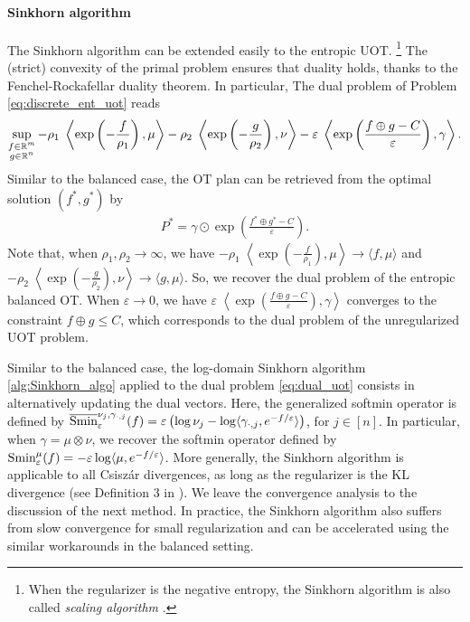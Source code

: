 \paragraph{Sinkhorn algorithm} The Sinkhorn algorithm can be extended easily to the entropic UOT.
\footnote{When the regularizer is the negative entropy, the Sinkhorn algorithm is also called
\textit{scaling algorithm} \citep{Chizat18a}.} The (strict) convexity of the primal problem ensures
that duality holds, thanks to the Fenchel-Rockafellar duality theorem. In particular,
The dual problem of Problem \eqref{eq:discrete_ent_uot} reads
\begin{align}
  \label{eq:dual_uot}
  \sup_{\substack{f \in \mathbb R^m \\ g \in \mathbb R^n}}
  -\rho_1 \; \left\langle \exp \left( - \frac{f}{\rho_1}\right), \mu \right\rangle
  -\rho_2 \; \left\langle \exp \left( - \frac{g}{\rho_2} \right), \nu \right\rangle
  - \varepsilon \; \left\langle \exp
  \left( \frac{f \oplus g - C}{\varepsilon} \right), \gamma \right\rangle.
\end{align}
Similar to the balanced case, the OT plan can be retrieved from the optimal solution $(f^*, g^*)$ by
\begin{align}
  P^* = \gamma \odot \exp \left( \frac{f^* \oplus g^* - C}{\varepsilon} \right).
\end{align}
Note that, when $\rho_1, \rho_2 \to \infty$, we have
$-\rho_1 \; \left\langle \exp \left( - \frac{f}{\rho_1}\right), \mu \right\rangle \to
\langle f, \mu \rangle$ and
$-\rho_2 \; \left\langle \exp \left( - \frac{g}{\rho_2} \right), \nu \right\rangle \to \langle g, \mu \rangle$.
So, we recover the dual problem of the entropic balanced OT.
When $\varepsilon \to 0$, we have
$\varepsilon \; \left\langle \exp \left( \frac{f \oplus g - C}{\varepsilon} \right), \gamma \right\rangle$
converges to the constraint $f \oplus g \leq C$, which corresponds to the dual problem of the
unregularized UOT problem.

Similar to the balanced case, the log-domain Sinkhorn algorithm \ref{alg:Sinkhorn_algo}
applied to the dual problem \eqref{eq:dual_uot} consists in alternatively updating the dual vectors.
Here, the generalized softmin operator is defined by
$\overline{\text{Smin}}^{\nu_j, \gamma_{\cdot, j}}_{\varepsilon}(f) =
\varepsilon \left( \log \nu_j - \log \langle \gamma_{\cdot, j}, e^{-f / \varepsilon} \rangle \right)$,
for $j \in [n]$. In particular, when $\gamma = \mu \otimes \nu$, we recover the softmin operator
\citep{Sejourne19} defined by
$\text{Smin}^{\mu}_{\varepsilon}(f) = -\varepsilon \log \langle \mu, e^{-f / \varepsilon} \rangle$.
More generally, the Sinkhorn algorithm is applicable to all Csiszár divergences,
as long as the regularizer is the KL divergence (see Definition 3 in \citep{Sejourne19}).
We leave the convergence analysis to the discussion of the next method.
In practice, the Sinkhorn algorithm also suffers from slow convergence for small regularization
and can be accelerated using the similar workarounds in the balanced setting.

